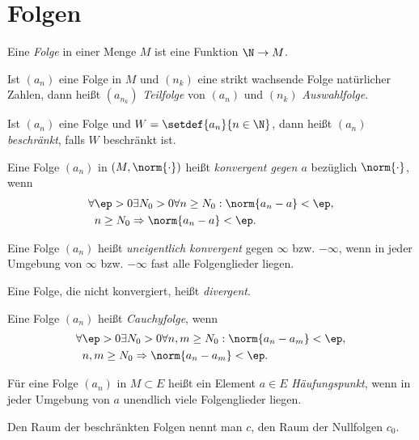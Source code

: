 \section{Folgen}

\begin{defn}
Eine \emph{Folge} in einer Menge $M$ ist eine Funktion $\N \to M$.
\end{defn}
\begin{defn}
Ist $(a_n)$ eine Folge in $M$ und $(n_k)$ eine strikt wachsende Folge
natürlicher Zahlen, dann heißt $(a_{n_k})$ \emph{Teilfolge} von $(a_n)$ und
$(n_k)$ \emph{Auswahlfolge}.
\end{defn}
\begin{defn}
Ist $(a_n)$ eine Folge und $W = \setdef{a_n}{n\in\N}$, dann heißt $(a_n)$
\emph{beschränkt}, falls $W$ beschränkt ist.
\end{defn}
\begin{defn}
Eine Folge $(a_n)$ in $(M,\norm{\cdot})$ heißt \emph{konvergent gegen $a$}
bezüglich $\norm{\cdot}$, wenn
\begin{align*}
\forall &\ep > 0 \exists N_0 >
0 \forall n \ge N_0:
\norm{a_n - a} < \ep,\\
& n \ge N_0 \Rightarrow \norm{a_n - a} < \ep.
\end{align*}
\end{defn}
\begin{defn}
Eine Folge $(a_n)$ heißt \emph{uneigentlich konvergent} gegen $\infty$ bzw.
$-\infty$, wenn in jeder Umgebung von $\infty$ bzw. $-\infty$ fast alle
Folgenglieder liegen.
\end{defn}
\begin{defn}
Eine Folge, die nicht konvergiert, heißt \emph{divergent}.
\end{defn}
\begin{defn}
Eine Folge $(a_n)$ heißt \emph{Cauchyfolge}, wenn
\begin{align*}
\forall &\ep > 0 \exists N_0 > 0 \forall n,m \ge N_0 :
\norm{a_n - a_m} < \ep,\\
&n,m \ge N_0 \Rightarrow \norm{a_n - a_m} < \ep.
\end{align*}
\end{defn}
\begin{defn}
Für eine Folge $(a_n)$ in $M\subset E$ heißt ein Element $a\in E$
\emph{Häufungspunkt}, wenn in jeder Umgebung von $a$ unendlich viele
Folgenglieder liegen.
\end{defn}
\begin{defn}
Den Raum der beschränkten Folgen nennt man $c$, den Raum der Nullfolgen $c_0$.
\end{defn}

